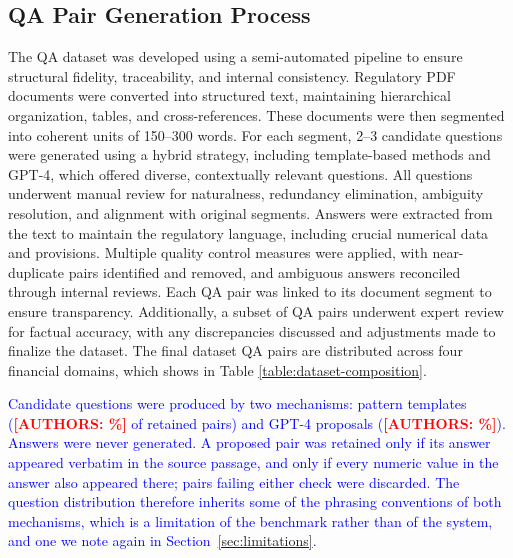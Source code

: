 \documentclass{article}
\newcommand{\revised}[1]{\textcolor{blue}{#1}}
\newcommand{\needsnum}[1]{\textcolor{red}{\textbf{[#1]}}}
\newcommand{\revised}[1]{#1}
\newcommand{\needsnum}[1]{#1}
\begin{document}
\subsection{QA Pair Generation Process}

The QA dataset was developed using a semi-automated pipeline to ensure structural
fidelity, traceability, and internal consistency. Regulatory PDF documents were
converted into structured text, maintaining hierarchical organization, tables, and
cross-references. These documents were then segmented into coherent units of 150--300
words. For each segment, 2--3 candidate questions were generated using a hybrid
strategy, including template-based methods and GPT-4, which offered diverse,
contextually relevant questions. All questions underwent manual review for naturalness,
redundancy elimination, ambiguity resolution, and alignment with original segments.
Answers were extracted from the text to maintain the regulatory language, including
crucial numerical data and provisions. Multiple quality control measures were applied,
with near-duplicate pairs identified and removed, and ambiguous answers reconciled
through internal reviews. Each QA pair was linked to its document segment to ensure
transparency. Additionally, a subset of QA pairs underwent expert review for factual
accuracy, with any discrepancies discussed and adjustments made to finalize the
dataset. The final dataset QA pairs are distributed across four financial domains,
which shows in Table \ref{table:dataset-composition}.

\revised{Candidate questions were produced by two mechanisms: pattern templates
(\needsnum{AUTHORS: \%} of retained pairs) and GPT-4 proposals (\needsnum{AUTHORS:
\%}). Answers were never generated. A proposed pair was retained only if its answer
appeared verbatim in the source passage, and only if every numeric value in the answer
also appeared there; pairs failing either check were discarded. The question
distribution therefore inherits some of the phrasing conventions of both mechanisms,
which is a limitation of the benchmark rather than of the system, and one we note again
in Section~\ref{sec:limitations}.}
\end{document}
